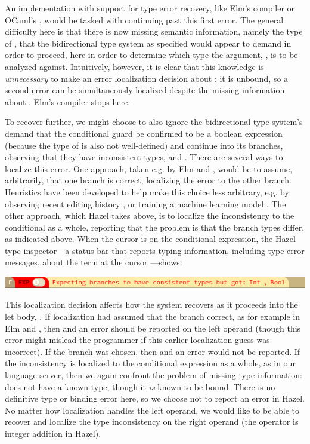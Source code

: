 An implementation with support for type error recovery, like Elm's compiler or OCaml's  \cite{bour2018merlin}, would 
 be tasked with continuing past this first error.
 The general difficulty here is that there is now missing semantic information, namely the type of , that 
 the bidirectional type system as specified 
 would appear to demand in order to proceed, here in order to determine which type the argument, , is to be analyzed against.
 Intuitively, however, it is clear that this knowledge is \emph{unnecessary} to make an error localization decision about : 
it is unbound, so a second error can be simultaneously localized despite the missing information about . Elm's compiler stops here.

To recover further, we might choose to also ignore the bidirectional type system's demand that the conditional guard be confirmed to be a boolean expression 
(because the type of  is also not well-defined) 
and continue into its branches, observing that they have inconsistent types,  and . 
There are several ways to localize this error. 
One approach, taken e.g. by Elm and , would be to assume, arbitrarily, that one branch is correct, localizing the error to the other branch. 
Heuristics have been developed to help make this choice less arbitrary, e.g. 
by observing recent editing history \cite{steady-typing}, 
or training a machine learning model \cite{SeidelBlame}. 
The other approach, which Hazel takes above, is to localize the inconsistency to the conditional as a whole, reporting that the problem is that the branch types differ, as indicated above. When the cursor is on the conditional expression, the Hazel type inspector---a status bar that reports typing information, including type error messages, about the term at the cursor \cite{potter2020hazel}---shows:

\begin{center}
  \includegraphics[width=\textwidth]{images/haz3l-inconsistent-branches-cursor-inspector.png}
\end{center}

This localization decision affects how the system recovers as it proceeds into the let body, . 
If localization had assumed that the  branch correct, as for example in Elm and , then  and an error should be reported on the left operand (though this error might mislead the programmer if this earlier localization guess was incorrect).
If the  branch was chosen, then  and an error would not be reported. 
If the inconsistency is localized to the conditional expression as a whole, as in our language server, then we again confront the problem of missing type information: 
 does not have a known type,
though it \emph{is} known to be bound. 
There is no definitive type or binding error here, 
so we choose not to report an error in Hazel.
No matter how localization handles the left operand, we would like to be able to recover and 
localize the type inconsistency on the right operand (the \li{+} operator is integer addition in Hazel).


